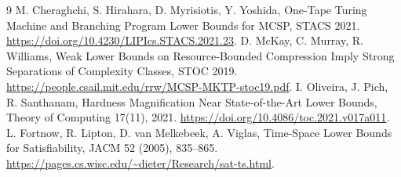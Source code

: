 \documentclass[11pt]{article}
\begin{document}
\begin{thebibliography}{9}
 M. Cheraghchi, S. Hirahara, D. Myrisiotis, Y. Yoshida,
One-Tape Turing Machine and Branching Program Lower Bounds for MCSP,
STACS 2021. \url{https://doi.org/10.4230/LIPIcs.STACS.2021.23}.
 D. McKay, C. Murray, R. Williams,
Weak Lower Bounds on Resource-Bounded Compression Imply Strong Separations of
Complexity Classes, STOC 2019.
\url{https://people.csail.mit.edu/rrw/MCSP-MKTP-stoc19.pdf}.
 I. Oliveira, J. Pich, R. Santhanam,
Hardness Magnification Near State-of-the-Art Lower Bounds,
Theory of Computing 17(11), 2021.
\url{https://doi.org/10.4086/toc.2021.v017a011}.
 L. Fortnow, R. Lipton, D. van Melkebeek, A. Viglas,
Time-Space Lower Bounds for Satisfiability, JACM 52 (2005), 835--865.
\url{https://pages.cs.wisc.edu/~dieter/Research/sat-ts.html}.
\end{thebibliography}

\end{document}
